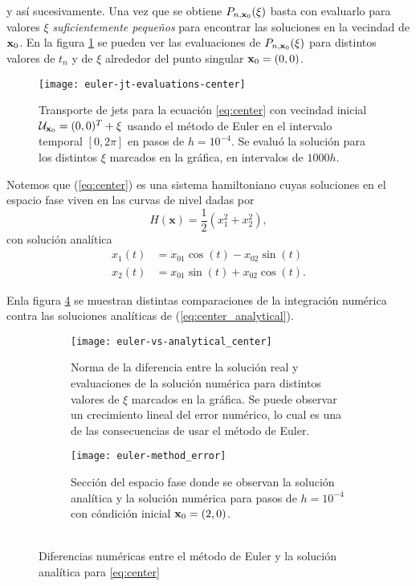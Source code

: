 y así sucesivamente. Una vez que se obtiene $P_{n,\mathbf{x}_0}(\xi)$ basta con evaluarlo para valores $\mathbb{\xi}$ \textit{suficientemente pequeños} para encontrar las soluciones en la vecindad de $\mathbf{x}_0$. En la figura \ref{fig:center-evals} se pueden ver las evaluaciones de $P_{n,\mathbf{x}_0}(\xi)$ para distintos valores de $t_n$ y de $\xi$ alrededor del punto singular $\mathbf{x}_0 = (0,0)$.

\begin{figure}[h!]
 \centering
 \texttt{[image: euler-jt-evaluations-center]}
 \caption{Transporte de jets para la ecuación \ref{eq:center} con vecindad inicial $\mathcal{U}_{\mathbf{x}_0} = (0,0)^T + \xi$ usando el método de Euler en el intervalo temporal $[0,2\pi]$ en pasos de $h=10^{-4}$. Se evaluó la solución para los distintos $\xi$ marcados en la gráfica, en intervalos de $1000h$.}
 \label{fig:center-evals}
\end{figure}

Notemos que (\ref{eq:center}) es una sistema hamiltoniano cuyas soluciones en el espacio fase viven en las curvas de nivel dadas por
\begin{equation*}
H(\mathbf{x}) = \frac{1}{2} \left( x_1^2 + x_2^2 \right),
\end{equation*} 
con solución analítica
\begin{align}
 x_1(t) &= x_{01}\cos{(t)} - x_{02}\sin{(t)} \nonumber \\
 x_2(t) &= x_{01}\sin{(t)} + x_{02}\cos{(t)}.
 \label{eq:center_analytical}
\end{align}

Enla figura \ref{fig:center_anal_comparison} se muestran distintas comparaciones de la integración numérica contra las soluciones analíticas de (\ref{eq:center_analytical}).

\begin{figure}[h!]
\centering
\begin{subfigure}{0.49\textwidth}
	\centering
	\texttt{[image: euler-vs-analytical\_center]}
	\caption{Norma de la diferencia entre la solución real y evaluaciones de la solución numérica para distintos valores de $\xi$ marcados en la gráfica. Se puede observar un crecimiento lineal del error numérico, lo cual es una de las consecuencias de usar el método de Euler.}
	\label{fig:center-eu_vs_anal}
\end{subfigure}
%
\begin{subfigure}{0.49\textwidth}
	\centering
	\texttt{[image: euler-method\_error]}
	\caption{Sección del espacio fase donde se observan la solución analítica y la solución numérica para pasos de $h=10^{-4}$ con cóndición inicial $\mathbf{x}_0 = (2,0)$. \\ \\}
	\label{fig:center_not-closed}
\end{subfigure}
\caption{Diferencias numéricas entre el método de Euler y la solución analítica para \ref{eq:center}}
\label{fig:center_anal_comparison}
\end{figure}


